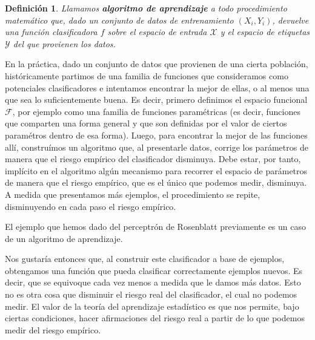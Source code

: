 \documentclass{report}
\newtheorem{dfn}{Definición}[section]
\begin{document}
\begin{dfn}
Llamamos \textbf{algoritmo de aprendizaje} a todo procedimiento matemático que, dado un conjunto
de datos de entrenamiento $(X_i,Y_i)$, devuelve una función clasificadora $f$ sobre el espacio de entrada $\mathcal{X}$ y el espacio de etiquetas $\mathcal{Y}$ del que
provienen los datos.
\end{dfn}

En la práctica, dado un conjunto de datos que provienen de una cierta población, históricamente partimos de una familia de funciones que
consideramos como potenciales clasificadores e intentamos encontrar la mejor de ellas, o al menos una que sea lo suficientemente buena. Es decir,
primero definimos el espacio funcional $\mathcal{F}$, por ejemplo como una familia de funciones paramétricas (es decir, funciones que comparten
una forma general y que son definidas por el valor de ciertos paramétros dentro de esa forma). Luego, para encontrar la mejor de
las funciones allí, construímos un algoritmo que, al presentarle datos, corrige los parámetros de manera que el riesgo empírico del clasificador
disminuya. Debe estar, por tanto, implícito en el algoritmo algún mecanismo para recorrer el espacio de parámetros de manera que el riesgo empírico,
que es el único que podemos medir, disminuya. A medida que presentamos más ejemplos, el procedimiento se repite, disminuyendo en cada paso el riesgo
empírico.

El ejemplo que hemos dado del perceptrón de Rosenblatt previamente es un caso de un algoritmo de aprendizaje.

Nos gustaría entonces que, al construir este clasificador a base de ejemplos, obtengamos una función que pueda clasificar correctamente
ejemplos nuevos. Es decir, que se equivoque cada vez menos a medida que le damos más datos. Esto no es otra cosa que disminuir el riesgo real
del clasificador, el cual no podemos medir. El valor de la teoría del aprendizaje estadístico es que nos permite, bajo ciertas condiciones,
hacer afirmaciones del riesgo real a partir de lo que podemos medir del riesgo empírico.
\end{document}
